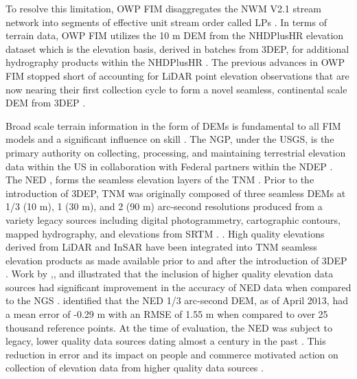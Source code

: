 \documentclass[preprint,review,12pt]{dependencies/elsarticle}
\begin{document}
To resolve this limitation, \ac{OWP} \ac{FIM} disaggregates the \ac{NWM} \ac{V2.1} stream network into segments of effective unit stream order called \acp{LP} \citep{aristizabal2022extending}.
In terms of terrain data, \ac{OWP} \ac{FIM} utilizes the 10 \ac{m} \ac{DEM} from the \ac{NHDPlusHR} elevation dataset which is the elevation basis, derived in batches from \ac{3DEP}, for additional hydrography products within the \ac{NHDPlusHR} \citep{aristizabal2022extending,moore2019user}.
The previous advances in \ac{OWP} \ac{FIM} stopped short of accounting for \ac{LiDAR} point elevation observations \citep{aristizabal2022extending} that are now nearing their first collection cycle to form a novel seamless, continental scale \ac{DEM} from \ac{3DEP} \citep{usgs2022status,usgs2022partnerships}.

Broad scale terrain information in the form of \acp{DEM} is fundamental to all \ac{FIM} models and a significant influence on skill \citep{bales2009sources,dobbs2010evaluation,wang2005comparison,merwade2008uncertainty,witt2015evaluation}. 
The \ac{NGP}, under the \ac{USGS}, is the primary authority on collecting, processing, and maintaining terrestrial elevation data within the \ac{US} in collaboration with Federal partners within the \ac{NDEP} \citep{omb2016circularA16,dewberry2011final,national2007elevation,national2009mapping,sugarbaker20143d}.
The \ac{NED} \citep{gesch2002national,gesch2007digital}, forms the seamless elevation layers of the \ac{TNM} \citep{gesch2009national,archuleta2017national,arundel2015preparing,arundel2018assimilation,kelmelis2003national}.
Prior to the introduction of \ac{3DEP}, \ac{TNM} was originally composed of three seamless \acp{DEM} at 1/3 (10 \ac{m}), 1 (30 \ac{m}), and 2 (90 \ac{m}) arc-second resolutions produced from a variety legacy sources including digital photogrammetry, cartographic contours, mapped hydrography, and elevations from \ac{SRTM} . \citep{gesch2002national,gesch2007digital,arundel2015preparing}.
High quality elevations derived from \ac{LiDAR} and \ac{InSAR} have been integrated into \ac{TNM} seamless elevation products as made available prior to and after the introduction of \ac{3DEP} \citep{snyder2013national,gesch2002national,arundel2015preparing}.
Work by \citet{gesch2014accuracy},\citep{gesch2007digital}, and \citet{dobbs2010evaluation} illustrated that the inclusion of higher quality elevation data sources had significant improvement in the accuracy of \ac{NED} data when compared to the \ac{NGS} \citep{roman2010geodesy}.
\citet{gesch2014accuracy} identified that the \ac{NED} 1/3 arc-second \ac{DEM}, as of April 2013, had a mean error of -0.29 \ac{m} with an \ac{RMSE} of 1.55 \ac{m} when compared to over 25 thousand reference points. 
At the time of evaluation, the \ac{NED} was subject to legacy, lower quality data sources dating almost a century in the past \citep{sugarbaker20143d,gesch2014accuracy,gesch2007digital}.
This reduction in error and its impact on people and commerce \citep{dewberry2011final} motivated action on collection of elevation data from higher quality data sources \citep{sugarbaker20143d}. 
\end{document}
